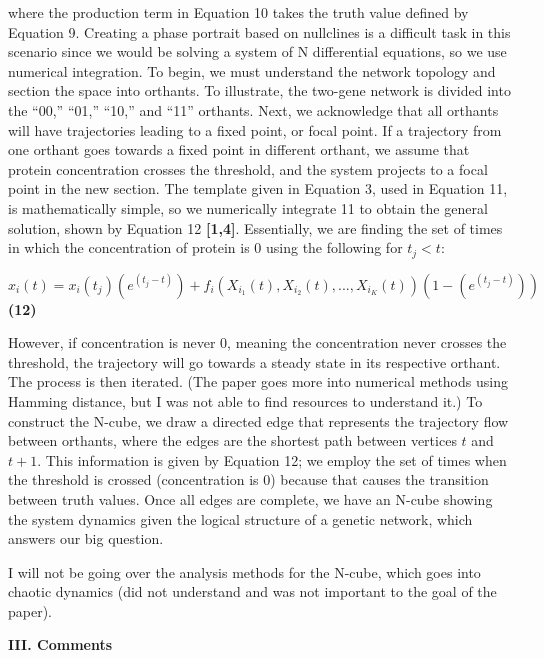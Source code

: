 \documentclass[11pt]{article}
\begin{document}
where the production term in Equation 10 takes the truth value defined by Equation 9. Creating a phase portrait based on nullclines is a difficult task in this scenario since we would be solving a system of N differential equations, so we use numerical integration. To begin, we must understand the network topology and section the space into orthants. To illustrate, the two-gene network is divided into the “00,” “01,” “10,” and “11” orthants. Next, we acknowledge that all orthants will have trajectories leading to a fixed point, or focal point. If a trajectory from one orthant goes towards a fixed point in different orthant, we assume that protein concentration crosses the threshold, and the system projects to a focal point in the new section. The template given in Equation 3, used in Equation 11, is mathematically simple, so we numerically integrate 11 to obtain the general solution, shown by Equation 12 \textbf{[1,4]}. Essentially, we are finding the set of times in which the concentration of protein is 0 using the following for $t_j<t$:

\begin{center}
$x_i(t) = x_i(t_j)(e^(t_j-t)) + f_i(X_{i_1}(t), X_{i_2}(t),...,X_{i_K}(t))(1-(e^(t_j-t)))$ \quad \textbf{(12)}
\end{center}

However, if concentration is never 0, meaning the concentration never crosses the threshold, the trajectory will go towards a steady state in its respective orthant. The process is then iterated. (The paper goes more into numerical methods using Hamming distance, but I was not able to find resources to understand it.) To construct the N-cube, we draw a directed edge that represents the trajectory flow between orthants, where the edges are the shortest path between vertices $t$ and $t+1$. This information is given by Equation 12; we employ the set of times when the threshold is crossed (concentration is 0) because that causes the transition between truth values.  Once all edges are complete, we have an N-cube showing the system dynamics given the logical structure of a genetic network, which answers our big question.

I will not be going over the analysis methods for the N-cube, which goes into chaotic dynamics (did not understand and was not important to the goal of the paper). 

\begin{center}
\end{center}
\textbf{III. Comments}\\
\end{document}
